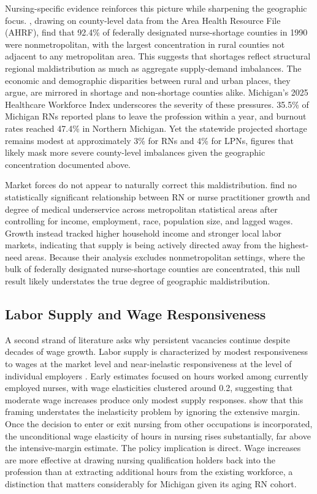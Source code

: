 \documentclass[12pt]{article}
\begin{document}
Nursing-specific evidence reinforces this picture while sharpening the geographic focus. \citet{stratton1995redefining}, drawing on county-level data from the Area Health Resource File (AHRF), find that 92.4\% of federally designated nurse-shortage counties in 1990 were nonmetropolitan, with the largest concentration in rural counties not adjacent to any metropolitan area. This suggests that shortages reflect structural regional maldistribution as much as aggregate supply-demand imbalances. The economic and demographic disparities between rural and urban places, they argue, are mirrored in shortage and non-shortage counties alike. Michigan's 2025 Healthcare Workforce Index underscores the severity of these pressures. 35.5\% of Michigan RNs reported plans to leave the profession within a year, and burnout rates reached 47.4\% in Northern Michigan. Yet the statewide projected shortage remains modest at approximately 3\% for RNs and 4\% for LPNs, figures that likely mask more severe county-level imbalances given the geographic concentration documented above.

Market forces do not appear to naturally correct this maldistribution. \citet{bowser2025} find no statistically significant relationship between RN or nurse practitioner growth and degree of medical underservice across metropolitan statistical areas after controlling for income, employment, race, population size, and lagged wages. Growth instead tracked higher household income and stronger local labor markets, indicating that supply is being actively directed away from the highest-need areas. Because their analysis excludes nonmetropolitan settings, where the bulk of federally designated nurse-shortage counties are concentrated, this null result likely understates the true degree of geographic maldistribution.

\subsection{Labor Supply and Wage Responsiveness}

A second strand of literature asks why persistent vacancies continue despite decades of wage growth. Labor supply is characterized by modest responsiveness to wages at the market level \citep{askildsen2003} and near-inelastic responsiveness at the level of individual employers \citep{staiger2010}. Early estimates focused on hours worked among currently employed nurses, with wage elasticities clustered around 0.2, suggesting that moderate wage increases produce only modest supply responses. \citet{hanel2014} show that this framing understates the inelasticity problem by ignoring the extensive margin. Once the decision to enter or exit nursing from other occupations is incorporated, the unconditional wage elasticity of hours in nursing rises substantially, far above the intensive-margin estimate. The policy implication is direct. Wage increases are more effective at drawing nursing qualification holders back into the profession than at extracting additional hours from the existing workforce, a distinction that matters considerably for Michigan given its aging RN cohort.
\end{document}
